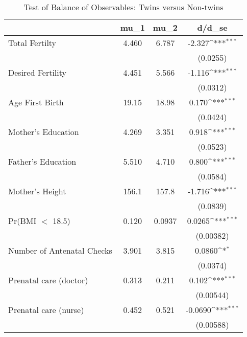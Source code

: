 \begin{table}[htbp]\centering
\def\sym#1{\ifmmode^{#1}\else\(^{#1}\)\fi}
\caption{Test of Balance of Observables: Twins versus Non-twins \label{TWINtab:comp}}
\begin{tabular}{l*{1}{ccc}}
\toprule
                    &        mu\_1&        mu\_2&      d/d\_se         \\
\midrule
Total Fertilty      &       4.460&       6.787&      -2.327\sym{***}\\
                    &            &            &    (0.0255)         \\
Desired Fertility   &       4.451&       5.566&      -1.116\sym{***}\\
                    &            &            &    (0.0312)         \\
Age First Birth     &       19.15&       18.98&       0.170\sym{***}\\
                    &            &            &    (0.0424)         \\
Mother's Education  &       4.269&       3.351&       0.918\sym{***}\\
                    &            &            &    (0.0523)         \\
Father's Education  &       5.510&       4.710&       0.800\sym{***}\\
                    &            &            &    (0.0584)         \\
Mother's Height     &       156.1&       157.8&      -1.716\sym{***}\\
                    &            &            &    (0.0839)         \\
Pr(BMI $<$ 18.5)    &       0.120&      0.0937&      0.0265\sym{***}\\
                    &            &            &   (0.00382)         \\
Number of Antenatal Checks&       3.901&       3.815&      0.0860\sym{*}  \\
                    &            &            &    (0.0374)         \\
Prenatal care (doctor)&       0.313&       0.211&       0.102\sym{***}\\
                    &            &            &   (0.00544)         \\
Prenatal care (nurse)&       0.452&       0.521&     -0.0690\sym{***}\\
                    &            &            &   (0.00588)         \\

\end{tabular}
\end{table}
